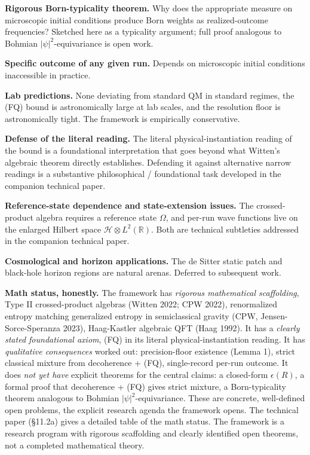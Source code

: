 \documentclass[11pt,a4paper]{article}
\begin{document}
\textbf{Rigorous Born-typicality theorem.} Why does the appropriate measure on microscopic initial conditions produce Born weights as realized-outcome frequencies? Sketched here as a typicality argument; full proof analogous to Bohmian $|\psi|^2$-equivariance is open work.

\textbf{Specific outcome of any given run.} Depends on microscopic initial conditions inaccessible in practice.

\textbf{Lab predictions.} None deviating from standard QM in standard regimes, the (FQ) bound is astronomically large at lab scales, and the resolution floor is astronomically tight. The framework is empirically conservative.

\textbf{Defense of the literal reading.} The literal physical-instantiation reading of the bound is a foundational interpretation that goes beyond what Witten's algebraic theorem directly establishes. Defending it against alternative narrow readings is a substantive philosophical / foundational task developed in the companion technical paper.

\textbf{Reference-state dependence and state-extension issues.} The crossed-product algebra requires a reference state $\Omega$, and per-run wave functions live on the enlarged Hilbert space $\mathcal{H} \otimes L^2(\mathbb{R})$. Both are technical subtleties addressed in the companion technical paper.

\textbf{Cosmological and horizon applications.} The de Sitter static patch and black-hole horizon regions are natural arenas. Deferred to subsequent work.

\textbf{Math status, honestly.} The framework has \emph{rigorous mathematical scaffolding}, Type II crossed-product algebras (Witten 2022; CPW 2022), renormalized entropy matching generalized entropy in semiclassical gravity (CPW, Jensen-Sorce-Speranza 2023), Haag-Kastler algebraic QFT (Haag 1992). It has a \emph{clearly stated foundational axiom}, (FQ) in its literal physical-instantiation reading. It has \emph{qualitative consequences} worked out: precision-floor existence (Lemma 1), strict classical mixture from decoherence + (FQ), single-record per-run outcome. It does \emph{not yet have} explicit theorems for the central claims: a closed-form $\epsilon(R)$, a formal proof that decoherence + (FQ) gives strict mixture, a Born-typicality theorem analogous to Bohmian $|\psi|^2$-equivariance. These are concrete, well-defined open problems, the explicit research agenda the framework opens. The technical paper (§11.2a) gives a detailed table of the math status. The framework is a research program with rigorous scaffolding and clearly identified open theorems, not a completed mathematical theory.
\end{document}
